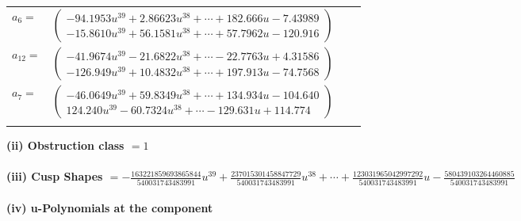 \documentclass[1p]{elsarticle_modified}
\theoremstyle{definition}
\begin{document}
\begin{tabular}{m{7pt} m{180pt} m{7pt} m{180pt} }
\flushright $a_{6}=$&$\begin{pmatrix}-94.1953 u^{39}+2.86623 u^{38}+\cdots+182.666 u-7.43989\\-15.8610 u^{39}+56.1581 u^{38}+\cdots+57.7962 u-120.916\end{pmatrix}$ \\
\flushright $a_{12}=$&$\begin{pmatrix}-41.9674 u^{39}-21.6822 u^{38}+\cdots-22.7763 u+4.31586\\-126.949 u^{39}+10.4832 u^{38}+\cdots+197.913 u-74.7568\end{pmatrix}$ \\
\flushright $a_{7}=$&$\begin{pmatrix}-46.0649 u^{39}+59.8349 u^{38}+\cdots+134.934 u-104.640\\124.240 u^{39}-60.7324 u^{38}+\cdots-129.631 u+114.774\end{pmatrix}$\\&\end{tabular}
\flushleft \textbf{(ii) Obstruction class $= 1$}\\~\\
\flushleft \textbf{(iii) Cusp Shapes $= -\frac{163221859693865844}{540031743483991} u^{39}+\frac{237015301458847729}{540031743483991} u^{38}+\cdots+\frac{123031965042997292}{540031743483991} u-\frac{580439103264460885}{540031743483991}$}\\~\\
\newpage\renewcommand{\arraystretch}{1}
\flushleft \textbf{(iv) u-Polynomials at the component}\newline \\
\end{document}
